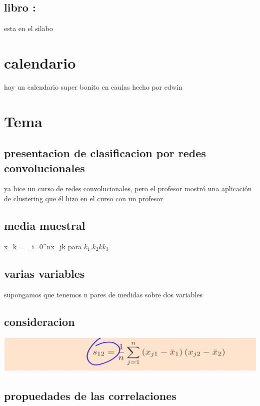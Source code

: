\documentclass[10pt,a4paper]{article} %
\begin{document}
            \subsection{libro :}
                esta en el silabo 
                \\ 
            \section{calendario}
                hay un calendario super bonito en eaulas hecho por edwin
    \section{Tema}
        \subsection{presentacion de clasificacion por redes convolucionales}
            ya hice un curso de redes convolucionales, pero el profesor mostró
            una aplicación de clustering que él hizo en el curso con un
            profesor
        \subsection{media muestral}
            x_{k} = \sum_{i=0}^{n}x_{jk} para $ k_1 . k_2 k k_3  $  
        \subsection{varias variables}
            supongamos que tenemos n pares de medidas sobre dos variables
        \subsection{consideracion}
            \includegraphics[width=0.8\linewidth]{cibsuderaciones.png}
        \subsection{propuedades de las correlaciones}
            
\end{document}
